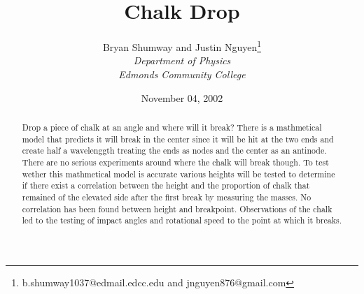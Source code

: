 \documentclass{article}
\begin{document}
\title{Chalk Drop}
\author{Bryan Shumway and Justin Nguyen\thanks{b.shumway1037@edmail.edcc.edu and jnguyen876@gmail.com}\vspace{10pt}\\
{\em Department of Physics}\\
{\em Edmonds Community College}}
\date{November 04, 2002}

\maketitle

\thispagestyle{empty}

\begin{abstract}
Drop a piece of chalk at an angle and where will it break? There is a mathmetical model that predicts it will break in the center since it will be hit at the two ends and create half a wavelenggth treating the ends as nodes and the center as an antinode. There are no serious experiments around where the chalk will break though. To test wether this mathmetical model is accurate various heights will be tested to determine if there exist a correlation between the height and the proportion of chalk that remained of the elevated side after the first break by measuring the masses. No correlation has been found between height and breakpoint. Observations of the chalk led to the testing of impact angles and rotational speed to the point at which it breaks.
\end{abstract}
\end{document}
